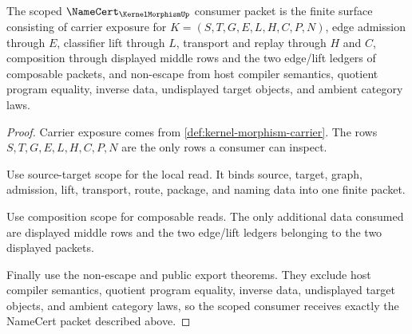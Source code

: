 \begin{theorem}
\label{thm:kernel-morphism-namecert-scope}
The scoped $\NameCert_{\KernelMorphismUp}$ consumer packet is the finite surface consisting of carrier exposure for $K=(S,T,G,E,L,H,C,P,N)$, edge admission through $E$, classifier lift through $L$, transport and replay through $H$ and $C$, composition through displayed middle rows and the two edge/lift ledgers of composable packets, and non-escape from host compiler semantics, quotient program equality, inverse data, undisplayed target objects, and ambient category laws.
\end{theorem}
\begin{proof}
Carrier exposure comes from \autoref{def:kernel-morphism-carrier}. The rows $S,T,G,E,L,H,C,P,N$ are the only rows a consumer can inspect.

Use source-target scope for the local read. It binds source, target, graph, admission, lift, transport, route, package, and naming data into one finite packet.

Use composition scope for composable reads. The only additional data consumed are displayed middle rows and the two edge/lift ledgers belonging to the two displayed packets.

Finally use the non-escape and public export theorems. They exclude host compiler semantics, quotient program equality, inverse data, undisplayed target objects, and ambient category laws, so the scoped consumer receives exactly the NameCert packet described above.
\end{proof}

